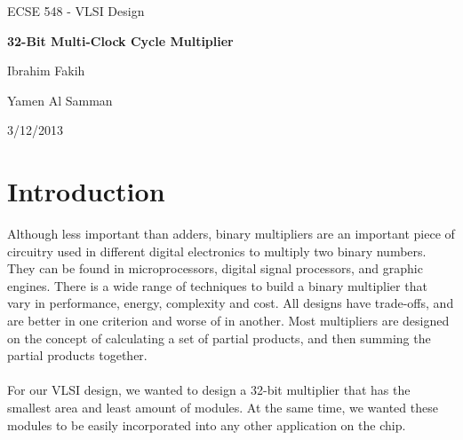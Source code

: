\documentclass{report}
\begin{document}
\Huge
\begin{center}ECSE 548 - VLSI Design \end{center}
\Huge\vspace{1cm}
\begin{center}\textbf{32-Bit Multi-Clock Cycle Multiplier} \end{center}
\Large
\vspace{4cm}
\begin{center} Ibrahim Fakih \end{center}
\begin{center} Yamen Al Samman \end{center}
\vspace{2cm}
\begin{center}
3/12/2013
\end{center}
\newpage
\normalsize
\section*{Introduction}
Although less important than adders, binary multipliers are an important piece of circuitry used in different digital electronics to multiply two binary numbers. They can be found in microprocessors, digital signal processors, and graphic engines. There is a wide range of techniques to build a binary multiplier that vary in performance, energy, complexity and cost. All designs have trade-offs, and are better in one criterion and worse of in another. Most multipliers are designed on the concept of calculating a set of partial products, and then summing the partial products together. 
\\\\
For our VLSI design, we wanted to design a 32-bit multiplier that has the smallest area and least amount of modules. At the same time, we wanted these modules to be easily incorporated into any other application on the chip.
\end{document}
